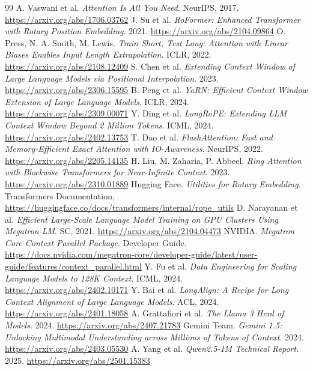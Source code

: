 \documentclass[UTF8,10pt,a4paper,fontset=none]{ctexart}
\begin{document}
\begin{thebibliography}{99}\small
{} A. Vaswani et al. \textit{Attention Is All You Need}. NeurIPS, 2017. \url{https://arxiv.org/abs/1706.03762}
 J. Su et al. \textit{RoFormer: Enhanced Transformer with Rotary Position Embedding}. 2021. \url{https://arxiv.org/abs/2104.09864}
 O. Press, N. A. Smith, M. Lewis. \textit{Train Short, Test Long: Attention with Linear Biases Enables Input Length Extrapolation}. ICLR, 2022. \url{https://arxiv.org/abs/2108.12409}
 S. Chen et al. \textit{Extending Context Window of Large Language Models via Positional Interpolation}. 2023. \url{https://arxiv.org/abs/2306.15595}
 B. Peng et al. \textit{YaRN: Efficient Context Window Extension of Large Language Models}. ICLR, 2024. \url{https://arxiv.org/abs/2309.00071}
 Y. Ding et al. \textit{LongRoPE: Extending LLM Context Window Beyond 2 Million Tokens}. ICML, 2024. \url{https://arxiv.org/abs/2402.13753}
 T. Dao et al. \textit{FlashAttention: Fast and Memory-Efficient Exact Attention with IO-Awareness}. NeurIPS, 2022. \url{https://arxiv.org/abs/2205.14135}
 H. Liu, M. Zaharia, P. Abbeel. \textit{Ring Attention with Blockwise Transformers for Near-Infinite Context}. 2023. \url{https://arxiv.org/abs/2310.01889}
 Hugging Face. \textit{Utilities for Rotary Embedding}. Transformers Documentation. \url{https://huggingface.co/docs/transformers/internal/rope_utils}
 D. Narayanan et al. \textit{Efficient Large-Scale Language Model Training on GPU Clusters Using Megatron-LM}. SC, 2021. \url{https://arxiv.org/abs/2104.04473}
 NVIDIA. \textit{Megatron Core Context Parallel Package}. Developer Guide. \url{https://docs.nvidia.com/megatron-core/developer-guide/latest/user-guide/features/context_parallel.html}
 Y. Fu et al. \textit{Data Engineering for Scaling Language Models to 128K Context}. ICML, 2024. \url{https://arxiv.org/abs/2402.10171}
 Y. Bai et al. \textit{LongAlign: A Recipe for Long Context Alignment of Large Language Models}. ACL, 2024. \url{https://arxiv.org/abs/2401.18058}
 A. Grattafiori et al. \textit{The Llama 3 Herd of Models}. 2024. \url{https://arxiv.org/abs/2407.21783}
 Gemini Team. \textit{Gemini 1.5: Unlocking Multimodal Understanding across Millions of Tokens of Context}. 2024. \url{https://arxiv.org/abs/2403.05530}
 A. Yang et al. \textit{Qwen2.5-1M Technical Report}. 2025. \url{https://arxiv.org/abs/2501.15383}

\end{thebibliography}
\end{document}
